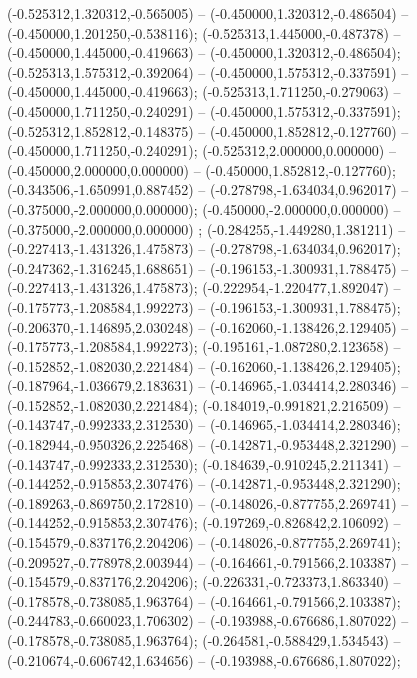  (-0.525312,1.320312,-0.565005) -- (-0.450000,1.320312,-0.486504) -- (-0.450000,1.201250,-0.538116);
 (-0.525313,1.445000,-0.487378) -- (-0.450000,1.445000,-0.419663) -- (-0.450000,1.320312,-0.486504);
 (-0.525313,1.575312,-0.392064) -- (-0.450000,1.575312,-0.337591) -- (-0.450000,1.445000,-0.419663);
 (-0.525313,1.711250,-0.279063) -- (-0.450000,1.711250,-0.240291) -- (-0.450000,1.575312,-0.337591);
 (-0.525312,1.852812,-0.148375) -- (-0.450000,1.852812,-0.127760) -- (-0.450000,1.711250,-0.240291);
 (-0.525312,2.000000,0.000000) -- (-0.450000,2.000000,0.000000) -- (-0.450000,1.852812,-0.127760);
 (-0.343506,-1.650991,0.887452) -- (-0.278798,-1.634034,0.962017) -- (-0.375000,-2.000000,0.000000);
 (-0.450000,-2.000000,0.000000) -- (-0.375000,-2.000000,0.000000) ;
 (-0.284255,-1.449280,1.381211) -- (-0.227413,-1.431326,1.475873) -- (-0.278798,-1.634034,0.962017);
 (-0.247362,-1.316245,1.688651) -- (-0.196153,-1.300931,1.788475) -- (-0.227413,-1.431326,1.475873);
 (-0.222954,-1.220477,1.892047) -- (-0.175773,-1.208584,1.992273) -- (-0.196153,-1.300931,1.788475);
 (-0.206370,-1.146895,2.030248) -- (-0.162060,-1.138426,2.129405) -- (-0.175773,-1.208584,1.992273);
 (-0.195161,-1.087280,2.123658) -- (-0.152852,-1.082030,2.221484) -- (-0.162060,-1.138426,2.129405);
 (-0.187964,-1.036679,2.183631) -- (-0.146965,-1.034414,2.280346) -- (-0.152852,-1.082030,2.221484);
 (-0.184019,-0.991821,2.216509) -- (-0.143747,-0.992333,2.312530) -- (-0.146965,-1.034414,2.280346);
 (-0.182944,-0.950326,2.225468) -- (-0.142871,-0.953448,2.321290) -- (-0.143747,-0.992333,2.312530);
 (-0.184639,-0.910245,2.211341) -- (-0.144252,-0.915853,2.307476) -- (-0.142871,-0.953448,2.321290);
 (-0.189263,-0.869750,2.172810) -- (-0.148026,-0.877755,2.269741) -- (-0.144252,-0.915853,2.307476);
 (-0.197269,-0.826842,2.106092) -- (-0.154579,-0.837176,2.204206) -- (-0.148026,-0.877755,2.269741);
 (-0.209527,-0.778978,2.003944) -- (-0.164661,-0.791566,2.103387) -- (-0.154579,-0.837176,2.204206);
 (-0.226331,-0.723373,1.863340) -- (-0.178578,-0.738085,1.963764) -- (-0.164661,-0.791566,2.103387);
 (-0.244783,-0.660023,1.706302) -- (-0.193988,-0.676686,1.807022) -- (-0.178578,-0.738085,1.963764);
 (-0.264581,-0.588429,1.534543) -- (-0.210674,-0.606742,1.634656) -- (-0.193988,-0.676686,1.807022);
